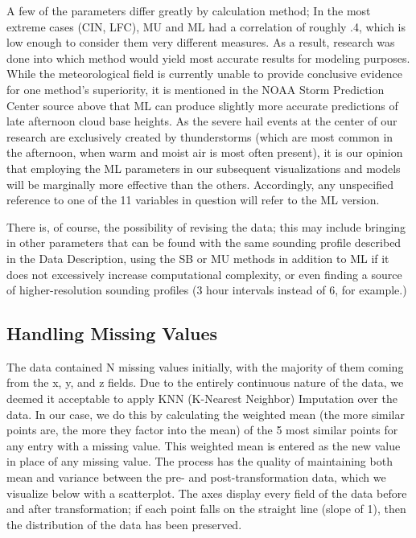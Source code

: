 \documentclass[fleqn,10pt]{SelfArx} %
\begin{document}
A few of the parameters differ greatly by calculation method; In the most extreme cases (CIN, LFC), MU and ML had a correlation of roughly .4, which is low enough to consider them very different measures. As a result, research was done into which method would yield most accurate results for modeling purposes. While the meteorological field is currently unable to provide conclusive evidence for one method's superiority, it is mentioned in the NOAA Storm Prediction Center source above that ML can produce slightly more accurate predictions of late afternoon cloud base heights. As the severe hail events at the center of our research are exclusively created by thunderstorms (which are most common in the afternoon, when warm and moist air is most often present), it is our opinion that employing the ML parameters in our subsequent visualizations and models will be marginally more effective than the others. Accordingly, any unspecified reference to one of the 11 variables in question will refer to the ML version.

There is, of course, the possibility of revising the data; this may include bringing in other parameters that can be found with the same sounding profile described in the Data Description, using the SB or MU methods in addition to ML if it does not excessively increase computational complexity, or even finding a source of higher-resolution sounding profiles (3 hour intervals instead of 6, for example.)

\clearpage

\subsection{Handling Missing Values}

The data contained N missing values initially, with the majority of them coming from the x, y, and z fields. Due to the entirely continuous nature of the data, we deemed it acceptable to apply KNN (K-Nearest Neighbor) Imputation over the data. In our case, we do this by calculating the weighted mean (the more similar points are, the more they factor into the mean) of the 5 most similar points for any entry with a missing value. This weighted mean is entered as the new value in place of any missing value. The process has the quality of maintaining both mean and variance between the pre- and post-transformation data, which we visualize below with a scatterplot. The axes display every field of the data before and after transformation; if each point falls on the straight line (slope of 1), then the distribution of the data has been preserved.
\end{document}
